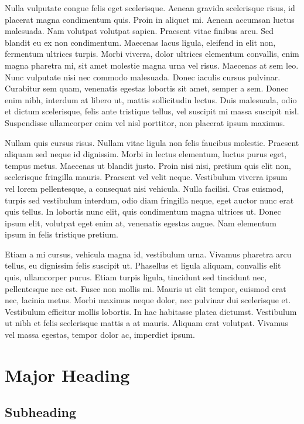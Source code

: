 \documentclass[12pt]{article}
\begin{document}
Nulla vulputate congue felis eget scelerisque. Aenean gravida scelerisque risus, id placerat magna condimentum quis. Proin in aliquet mi. Aenean accumsan luctus malesuada. Nam volutpat volutpat sapien. Praesent vitae finibus arcu. Sed blandit eu ex non condimentum. Maecenas lacus ligula, eleifend in elit non, fermentum ultrices turpis. Morbi viverra, dolor ultrices elementum convallis, enim magna pharetra mi, sit amet molestie magna urna vel risus. Maecenas at sem leo. Nunc vulputate nisi nec commodo malesuada. Donec iaculis cursus pulvinar. Curabitur sem quam, venenatis egestas lobortis sit amet, semper a sem. Donec enim nibh, interdum at libero ut, mattis sollicitudin lectus. Duis malesuada, odio et dictum scelerisque, felis ante tristique tellus, vel suscipit mi massa suscipit nisl. Suspendisse ullamcorper enim vel nisl porttitor, non placerat ipsum maximus.

Nullam quis cursus risus. Nullam vitae ligula non felis faucibus molestie. Praesent aliquam sed neque id dignissim. Morbi in lectus elementum, luctus purus eget, tempus metus. Maecenas ut blandit justo. Proin nisi nisi, pretium quis elit non, scelerisque fringilla mauris. Praesent vel velit neque. Vestibulum viverra ipsum vel lorem pellentesque, a consequat nisi vehicula. Nulla facilisi. Cras euismod, turpis sed vestibulum interdum, odio diam fringilla neque, eget auctor nunc erat quis tellus. In lobortis nunc elit, quis condimentum magna ultrices ut. Donec ipsum elit, volutpat eget enim at, venenatis egestas augue. Nam elementum ipsum in felis tristique pretium.

Etiam a mi cursus, vehicula magna id, vestibulum urna. Vivamus pharetra arcu tellus, eu dignissim felis suscipit ut. Phasellus et ligula aliquam, convallis elit quis, ullamcorper purus. Etiam turpis ligula, tincidunt sed tincidunt nec, pellentesque nec est. Fusce non mollis mi. Mauris ut elit tempor, euismod erat nec, lacinia metus. Morbi maximus neque dolor, nec pulvinar dui scelerisque et. Vestibulum efficitur mollis lobortis. In hac habitasse platea dictumst. Vestibulum ut nibh et felis scelerisque mattis a at mauris. Aliquam erat volutpat. Vivamus vel massa egestas, tempor dolor ac, imperdiet ipsum.

\section*{Major Heading}
\subsection*{Subheading}
\end{document}
